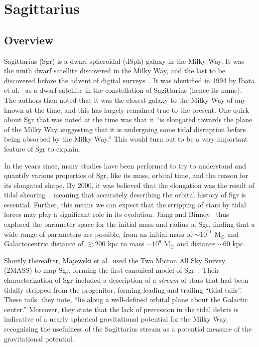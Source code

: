 \hypertarget{sagittarius}{%
\chapter{Sagittarius}\label{sagittarius}}

\hypertarget{overview}{%
\section{Overview}\label{overview}}

Sagittarius (Sgr) is a dwarf spheroidal (dSph) galaxy in the Milky Way. It was
the ninth dwarf satellite discovered in the Milky Way, and the last to be
discovered before the advent of digital surveys~\cite{simon_faintest_2019}. It
was identified in 1994 by Ibata et al.~\cite{ibata_dwarf_1994} as a dwarf
satellite in the constellation of Sagittarius (hence its name). The authors
then noted that it was the closest galaxy to the Milky Way of any known at the
time, and this has largely remained true to the present.  One quirk about Sgr
that was noted at the time was that it ``is elongated towards the plane of the
Milky Way, suggesting that it is undergoing some tidal disruption before being
absorbed by the Milky Way.'' This would turn out to be a very important
feature of Sgr to explain.

In the years since, many studies have been performed to try to understand and
quantify various properties of Sgr, like its mass, orbital time, and the
reason for its elongated shape. By 2000, it was believed that the elongation
was the result of tidal shearing~\cite{jiang_orbit_2000}, meaning that
accurately describing the orbital history of Sgr is essential. Further, this
means we can expect that the stripping of stars by tidal forces may play a
significant role in its evolution. Jiang and Binney~\cite{jiang_orbit_2000}
thus explored the parameter space for the initial mass and radius of Sgr,
finding that a wide range of parameters are possible, from an initial mass of
\(\sim 10^{11}\) M\(_\odot\) and Galactocentric distance of \(\gtrsim 200\)
kpc to mass \(\sim 10^9\) M\(_\odot\) and distance \(\sim 60\) kpc.

Shortly thereafter, Majewski et al.~used the Two Micron All Sky Survey (2MASS)
to map Sgr, forming the first canonical model of Sgr~\cite{majewski_two_2003}.
Their characterization of Sgr included a description of a \emph{stream} of
stars that had been tidally stripped from the progenitor, forming leading and
trailing ``tidal tails''.  These tails, they note, ``lie along a well-defined
orbital plane about the Galactic center.'' Moreover, they state that the lack
of precession in the tidal debris is indicative of a nearly spherical
gravitational potential for the Milky Way, recognizing the usefulness of the
Sagittarius stream as a potential measure of the gravitational potential.


